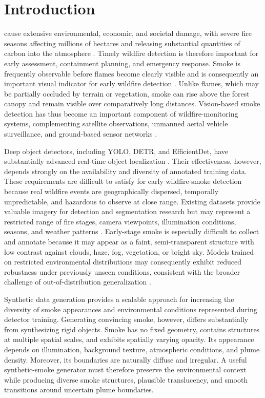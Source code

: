 \documentclass[journal]{IEEEtran}
\begin{document}
\section{Introduction}
\label{sec:introduction}

 cause extensive environmental, economic,
and societal damage, with severe fire seasons affecting millions of
hectares and releasing substantial quantities of carbon into the
atmosphere
\cite{Giglio2018-ca,Jain2024,Byrne2024}. Timely wildfire detection is
therefore important for early assessment, containment planning, and
emergency response. Smoke is frequently observable before flames become
clearly visible and is consequently an important visual indicator for
early wildfire detection
\cite{7823512,BOUGUETTAYA2022108309}. Unlike flames, which may be
partially occluded by terrain or vegetation, smoke can rise above the
forest canopy and remain visible over comparatively long distances.
Vision-based smoke detection has thus become an important component of
wildfire-monitoring systems, complementing satellite observations,
unmanned aerial vehicle surveillance, and ground-based sensor networks
\cite{BOUGUETTAYA2022108309,Karger2026}.

Deep object detectors, including YOLO, DETR, and EfficientDet, have
substantially advanced real-time object localization
\cite{redmon2016lookonceunifiedrealtime,
carion2020endtoendobjectdetectiontransformers,
tan2020efficientdetscalableefficientobject}. Their effectiveness,
however, depends strongly on the availability and diversity of
annotated training data. These requirements are difficult to satisfy
for early wildfire-smoke detection because real wildfire events are
geographically dispersed, temporally unpredictable, and hazardous to
observe at close range. Existing datasets provide valuable imagery for
detection and segmentation research but may represent a restricted
range of fire stages, camera viewpoints, illumination conditions,
seasons, and weather patterns
\cite{shamsoshoara2020aerialimagerypileburn}. Early-stage smoke is
especially difficult to collect and annotate because it may appear as
a faint, semi-transparent structure with low contrast against clouds,
haze, fog, vegetation, or bright sky. Models trained on restricted
environmental distributions may consequently exhibit reduced
robustness under previously unseen conditions, consistent with the
broader challenge of out-of-distribution generalization
\cite{hendrycks2021facesrobustnesscriticalanalysis}.

Synthetic data generation provides a scalable approach for increasing
the diversity of smoke appearances and environmental conditions
represented during detector training. Generating convincing smoke,
however, differs substantially from synthesizing rigid objects. Smoke
has no fixed geometry, contains structures at multiple spatial scales,
and exhibits spatially varying opacity. Its appearance depends on
illumination, background texture, atmospheric conditions, and plume
density. Moreover, its boundaries are naturally diffuse and irregular.
A useful synthetic-smoke generator must therefore preserve the
environmental context while producing diverse smoke structures,
plausible translucency, and smooth transitions around uncertain plume
boundaries.
\end{document}

